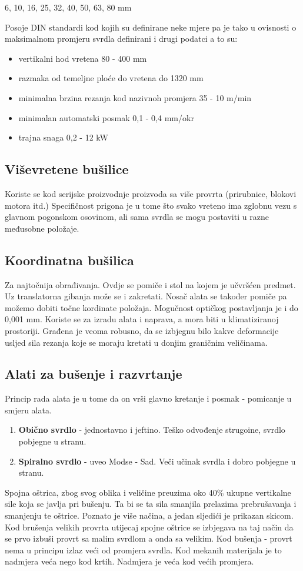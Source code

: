 \documentclass[a4paper,12pt]{article}
\numberwithin{figure}{section}
\begin{document}
\begin{center}
6, 10, 16, 25, 32, 40, 50, 63, 80 mm
\end{center}
Posoje DIN standardi kod kojih su definirane neke mjere pa je tako u ovisnosti o maksimalnom promjeru svrdla definirani i drugi podatci a to su:
\begin{itemize}
\item vertikalni hod vretena 80 - 400 mm
\item razmaka od temeljne ploće do vretena do 1320 mm
\item minimalna brzina rezanja kod nazivnoh promjera  35 - 10 m/min
\item minimalan automatski posmak 0,1 - 0,4 mm/okr
\item trajna snaga 0,2 - 12 kW
\end{itemize}
\subsection{Viševretene bušilice}
Koriste se kod serijske proizvodnje proizvoda sa više provrta (prirubnice, blokovi motora itd.) Specifičnost prigona je u tome što svako vreteno ima zglobnu vezu s glavnom pogonskom osovinom, ali sama svrdla se mogu postaviti u razne međusobne položaje.
\subsection{Koordinatna bušilica}
Za najtočnija obrađivanja. Ovdje se pomiče i stol na kojem je učvršćen predmet. Uz translatorna gibanja može se i zakretati. Nosač alata se također pomiče pa možemo dobiti točne kordinate položaja. Mogučnost optičkog postavljanja je i do 0,001 mm. Koriste se za izradu alata i naprava, a mora biti u klimatiziranoj prostoriji. Građena je veoma robusno, da se izbjegnu bilo kakve deformacije usljed sila rezanja koje se moraju kretati u donjim graničnim veličinama.
\subsection{Alati za bušenje i razvrtanje}
Princip rada alata je u tome da on vrši glavno kretanje i posmak - pomicanje u smjeru alata.
\begin{enumerate}
\item \textbf{Obično svrdlo} - jednostavno i jeftino. Teško odvođenje strugoine, svrdlo pobjegne u stranu.
\item \textbf{Spiralno svrdlo} - uveo Modse - Sad. Veči učinak svrdla i dobro pobjegne u stranu.
\end{enumerate}
Spojna oštrica, zbog svog oblika i veličine preuzima oko 40\% ukupne vertikalne sile koja se javlja pri bušenju. Ta bi se ta sila smanjila prelazima prebrušavanja i smanjenju te oštrice. Poznato je više načina, a jedan sljedići je prikazan skicom.
Kod brušenja velikih provrta utijecaj spojne oštrice se izbjegava na taj način da se prvo izbuši provrt sa malim svrdlom a onda sa velikim.
Kod bušenja - provrt nema u principu izlaz veći od promjera svrdla. Kod mekanih materijala je to nadmjera veća nego kod krtih. Nadmjera je veća kod većih promjera.
\end{document}

